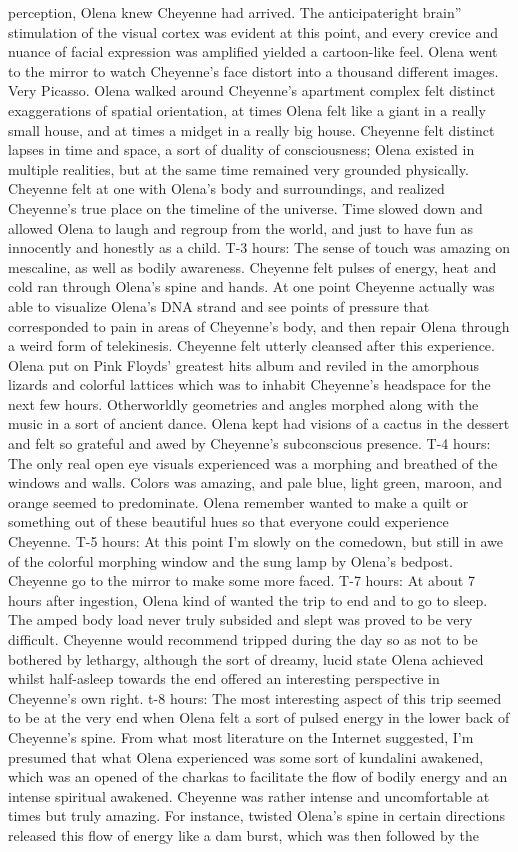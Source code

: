 \documentclass[12pt]{book}
\begin{document}
perception, Olena knew Cheyenne had arrived. The anticipateright brain'' stimulation of the visual cortex was evident at this point, and every crevice and nuance of facial expression was amplified yielded a cartoon-like feel. Olena went to the mirror to watch Cheyenne's face distort into a thousand different images. Very Picasso. Olena walked around Cheyenne's apartment complex felt distinct exaggerations of spatial orientation, at times Olena felt like a giant in a really small house, and at times a midget in a really big house. Cheyenne felt distinct lapses in time and space, a sort of duality of consciousness; Olena existed in multiple realities, but at the same time remained very grounded physically. Cheyenne felt at one with Olena's body and surroundings, and realized Cheyenne's true place on the timeline of the universe. Time slowed down and allowed Olena to laugh and regroup from the world, and just to have fun as innocently and honestly as a child. T-3 hours: The sense of touch was amazing on mescaline, as well as bodily awareness. Cheyenne felt pulses of energy, heat and cold ran through Olena's spine and hands. At one point Cheyenne actually was able to visualize Olena's DNA strand and see points of pressure that corresponded to pain in areas of Cheyenne's body, and then repair Olena through a weird form of telekinesis. Cheyenne felt utterly cleansed after this experience. Olena put on Pink Floyds' greatest hits album and reviled in the amorphous lizards and colorful lattices which was to inhabit Cheyenne's headspace for the next few hours. Otherworldly geometries and angles morphed along with the music in a sort of ancient dance. Olena kept had visions of a cactus in the dessert and felt so grateful and awed by Cheyenne's subconscious presence. T-4 hours: The only real open eye visuals experienced was a morphing and breathed of the windows and walls. Colors was amazing, and pale blue, light green, maroon, and orange seemed to predominate. Olena remember wanted to make a quilt or something out of these beautiful hues so that everyone could experience Cheyenne. T-5 hours: At this point I'm slowly on the comedown, but still in awe of the colorful morphing window and the sung lamp by Olena's bedpost. Cheyenne go to the mirror to make some more faced. T-7 hours: At about 7 hours after ingestion, Olena kind of wanted the trip to end and to go to sleep. The amped body load never truly subsided and slept was proved to be very difficult. Cheyenne would recommend tripped during the day so as not to be bothered by lethargy, although the sort of dreamy, lucid state Olena achieved whilst half-asleep towards the end offered an interesting perspective in Cheyenne's own right. t-8 hours: The most interesting aspect of this trip seemed to be at the very end when Olena felt a sort of pulsed energy in the lower back of Cheyenne's spine. From what most literature on the Internet suggested, I'm presumed that what Olena experienced was some sort of kundalini awakened, which was an opened of the charkas to facilitate the flow of bodily energy and an intense spiritual awakened. Cheyenne was rather intense and uncomfortable at times but truly amazing. For instance, twisted Olena's spine in certain directions released this flow of energy like a dam burst, which was then followed by the 
\end{document}
